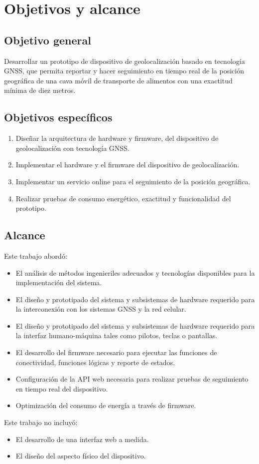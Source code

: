 \section{Objetivos y alcance}
\label{sec:objetivos}

\subsection{Objetivo general} 

Desarrollar un prototipo de dispositivo de geolocalización basado en tecnología GNSS, que permita reportar y hacer seguimiento en tiempo real de la posición geográfica de una cava móvil de transporte de alimentos con una exactitud mínima de diez metros.


\subsection{Objetivos específicos} 

\begin{enumerate}
    \item Diseñar la arquitectura de hardware y firmware, del dispositivo de geolocalización con tecnología GNSS. 
    \item Implementar el hardware y el firmware del dispositivo de geolocalización.
    \item Implementar un servicio online para el seguimiento de la posición geográfica.
    \item Realizar pruebas de consumo energético, exactitud y funcionalidad del prototipo.
\end{enumerate}


\subsection{Alcance} 

Este trabajo abordó:
\begin{itemize}
    \item El análisis de métodos ingenieriles adecuados y tecnologías disponibles para la implementación del sistema.
    \item El diseño y prototipado del sistema y subsistemas de hardware requerido para la interconexión con los sistemas GNSS y la red celular. 
    \item El diseño y prototipado del sistema y subsistemas de hardware requerido para la interfaz humano-máquina tales como pilotos, teclas o pantallas. 
    \item El desarrollo del firmware necesario para ejecutar las funciones de conectividad, funciones lógicas y reporte de estados.
    \item Configuración de la API web necesaria para realizar pruebas de seguimiento en tiempo real del dispositivo. 
    \item Optimización del consumo de energía a través de firmware.
\end{itemize}

Este trabajo no incluyó:

\begin{itemize}
    \item El desarrollo de una interfaz web a medida.
    \item El diseño del aspecto físico del dispositivo. 
\end{itemize}



